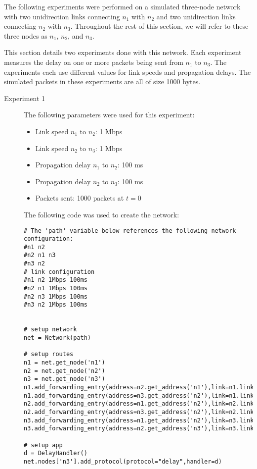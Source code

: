 \documentclass[11pt]{article}
\begin{document}
The following experiments were performed on a simulated three-node network with two unidirection links connecting $n_1$ with $n_2$ and two unidirection links connecting $n_2$ with $n_3$. Throughout the rest of this section, we will refer to these three nodes as $n_1$, $n_2$, and $n_3$.

This section details two experiments done with this network. Each experiment measures the delay on one or more packets being sent from $n_1$ to $n_3$. The experiments each use different values for link speeds and propagation delays. The simulated packets in these experiments are all of size 1000 bytes.

\begin{description}
\item[Experiment 1] \hfill \break
The following parameters were used for this experiment:

\begin{itemize}
\item Link speed $n_1$ to $n_2$: 1 Mbps
\item Link speed $n_2$ to $n_3$: 1 Mbps
\item Propagation delay $n_1$ to $n_2$: 100 ms
\item Propagation delay $n_2$ to $n_3$: 100 ms
\item Packets sent: 1000 packets at $t = 0$
\end{itemize}

\medskip

The following code was used to create the network:

\medskip

\begin{lstlisting}
# The 'path' variable below references the following network configuration:
#n1 n2
#n2 n1 n3
#n3 n2
# link configuration
#n1 n2 1Mbps 100ms
#n2 n1 1Mbps 100ms
#n2 n3 1Mbps 100ms
#n3 n2 1Mbps 100ms


# setup network
net = Network(path)

# setup routes
n1 = net.get_node('n1')
n2 = net.get_node('n2')
n3 = net.get_node('n3')
n1.add_forwarding_entry(address=n2.get_address('n1'),link=n1.links[0])
n1.add_forwarding_entry(address=n3.get_address('n2'),link=n1.links[0])
n2.add_forwarding_entry(address=n1.get_address('n2'),link=n2.links[0])
n2.add_forwarding_entry(address=n3.get_address('n2'),link=n2.links[1])
n3.add_forwarding_entry(address=n1.get_address('n2'),link=n3.links[0])
n3.add_forwarding_entry(address=n2.get_address('n3'),link=n3.links[0])

# setup app
d = DelayHandler()
net.nodes['n3'].add_protocol(protocol="delay",handler=d)


\end{lstlisting}
\end{description}
\end{document}
